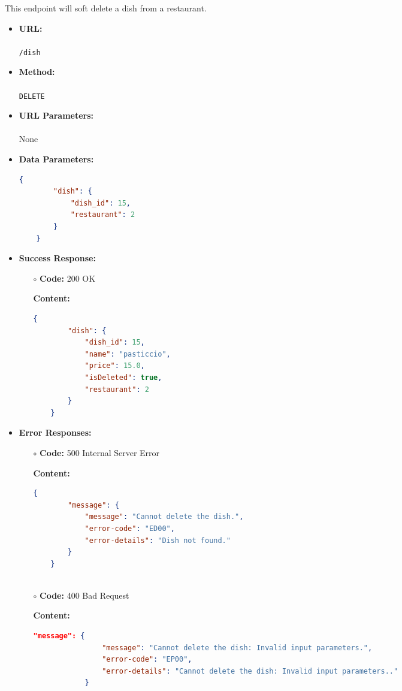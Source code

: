 

This endpoint will soft delete a dish from a restaurant.

\begin{itemize}
	\item \textbf{URL:} \\\\\texttt{/dish}
	\item \textbf{Method:} \\\\\texttt{DELETE}
	\item \textbf{URL Parameters:} \\\\None
	\item \textbf{Data Parameters:}
	\begin{lstlisting}[language=json]	
	{	
		"dish": {
			"dish_id": 15,
			"restaurant": 2
		}			
	}
	\end{lstlisting}
	\item \textbf{Success Response:}
	\begin{itemize}
		\item[$\circ$] \textbf{Code:} 200 OK
		\item[] \textbf{Content:}
		\begin{lstlisting}[language=json]
	{
		"dish": {
			"dish_id": 15,
			"name": "pasticcio",
			"price": 15.0,
			"isDeleted": true,
			"restaurant": 2
		}
	}
		\end{lstlisting}
	\end{itemize}
	
	\item \textbf{Error Responses:}
	\begin{itemize}
		\item[$\circ$] \textbf{Code:} 500 Internal Server Error
		\item[] \textbf{Content:}
		\begin{lstlisting}[language=json]	
	{
		"message": {
			"message": "Cannot delete the dish.",
			"error-code": "ED00",
			"error-details": "Dish not found."
		}
	}
			
		\end{lstlisting}		
		\item[$\circ$] \textbf{Code:} 400 Bad Request
		\item[] \textbf{Content:}
		\begin{lstlisting}[language=json]
			"message": {
				"message": "Cannot delete the dish: Invalid input parameters.",
				"error-code": "EP00",
				"error-details": "Cannot delete the dish: Invalid input parameters.."
			}
		\end{lstlisting}
	

\end{itemize}
\end{itemize}
